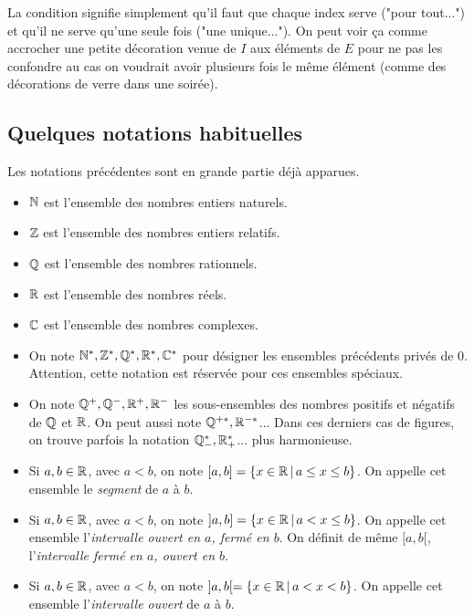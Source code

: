 La condition signifie simplement qu'il faut que chaque index serve ("pour tout...") et qu'il ne serve qu'une seule fois ("une unique..."). On peut voir ça comme accrocher une petite décoration venue de $I$ aux éléments de $E$ pour ne pas les confondre au cas on voudrait avoir plusieurs fois le même élément (comme des décorations de verre dans une soirée).

\subsection{Quelques notations habituelles}

Les notations précédentes sont en grande partie déjà apparues.

\begin{itemize}
    \item $\mathbb{N}$ est l'ensemble des nombres entiers naturels.
    \item $\mathbb{Z}$ est l'ensemble des nombres entiers relatifs.
    \item $\mathbb{Q}$ est l'ensemble des nombres rationnels.
    \item $\mathbb{R}$ est l'ensemble des nombres réels.
    \item $\mathbb{C}$ est l'ensemble des nombres complexes.
    \item On note $\mathbb{N}^*, \mathbb{Z}^*, \mathbb{Q}^*, \mathbb{R}^*, \mathbb{C}^*$ pour désigner les ensembles précédents privés de $0$. Attention, cette notation est réservée pour ces ensembles spéciaux.
    \item On note $\mathbb{Q}^+, \mathbb{Q}^-, \mathbb{R}^+, \mathbb{R}^-$ les sous-ensembles des nombres positifs et négatifs de $\mathbb{Q}$ et $\mathbb{R}$. On peut aussi note $\mathbb{Q}^{+*}, \mathbb{R}^{-*}$... Dans ces derniers cas de figures, on trouve parfois la notation $\mathbb{Q}_-^*, \mathbb{R}_+^*$... plus harmonieuse.
    \item Si $a, b \in \mathbb{R}$, avec $a<b$, on note $[a, b] = \{x \in \mathbb{R} \,\vert\, a \leq x \leq b\}$. On appelle cet ensemble le \emph{segment} de $a$ à $b$.
    \item Si $a, b \in \mathbb{R}$, avec $a<b$, on note $]a, b] = \{x \in \mathbb{R} \,\vert\, a < x \leq b\}$. On appelle cet ensemble l'\emph{intervalle ouvert en $a$, fermé en $b$}. On définit de même $[a, b[$, l'\emph{intervalle fermé en $a$, ouvert en $b$}.
    \item Si $a, b \in \mathbb{R}$, avec $a<b$, on note $]a, b[ = \{x \in \mathbb{R} \,\vert\, a < x < b\}$. On appelle cet ensemble l'\emph{intervalle ouvert} de $a$ à $b$.
\end{itemize}